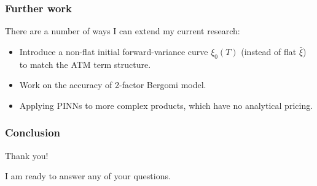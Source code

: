 \documentclass{beamer}
\begin{document}
\begin{frame}
\frametitle{Further work}
There are a number of ways I can extend my current research:
\begin{itemize}
    \item Introduce a non-flat initial forward-variance curve $\xi_0(T)$
      (instead of flat $\bar\xi$) to match the ATM term structure.
    \item Work on the accuracy of 2-factor Bergomi model.
    \item Applying PINNs to more complex products, which have no analytical pricing.
\end{itemize}
\end{frame}

\begin{frame}
\frametitle{Conclusion}
\begin{center}
    Thank you!

    I am ready to answer any of your questions.
\end{center}
\end{frame}
\end{document}
